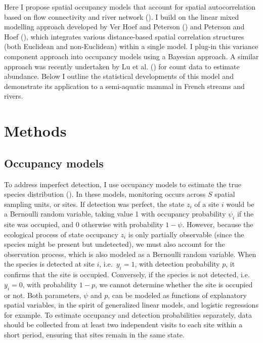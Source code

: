 \documentclass[
  11pt,
  a4paper,
]{article}
\begin{document}
Here I propose spatial occupancy models that account for spatial autocorrelation based on flow connectivity and river network (). I build on the linear mixed modelling approach developed by Ver Hoef and Peterson () and Peterson and Hoef (), which integrates various distance-based spatial correlation structures (both Euclidean and non-Euclidean) within a single model. I plug-in this variance component approach into occupancy models using a Bayesian approach. A similar approach was recently undertaken by Lu et al. () for count data to estimate abundance. Below I outline the statistical developments of this model and demonstrate its application to a semi-aquatic mammal in French streams and rivers.

\section{Methods}\label{methods}

\subsection{Occupancy models}\label{occupancy-models}

To address imperfect detection, I use occupancy models to estimate the true species distribution (). In these models, monitoring occurs across \(S\) spatial sampling units, or sites. If detection was perfect, the state \(z_i\) of a site \(i\) would be a Bernoulli random variable, taking value 1 with occupancy probability \(\psi_i\) if the site was occupied, and 0 otherwise with probability \(1-\psi\). However, because the ecological process of state occupancy \(z_i\) is only partially observable (since the species might be present but undetected), we must also account for the observation process, which is also modeled as a Bernoulli random variable. When the species is detected at site \(i\), i.e.~\(y_i = 1\), with detection probability \(p\), it confirms that the site is occupied. Conversely, if the species is not detected, i.e.~\(y_i = 0\), with probability \(1-p\), we cannot determine whether the site is occupied or not. Both parameters, \(\psi\) and \(p\), can be modeled as functions of explanatory spatial variables, in the spirit of generalized linear models, and logistic regressions for example. To estimate occupancy and detection probabilities separately, data should be collected from at least two independent visits to each site within a short period, ensuring that sites remain in the same state.
\end{document}
